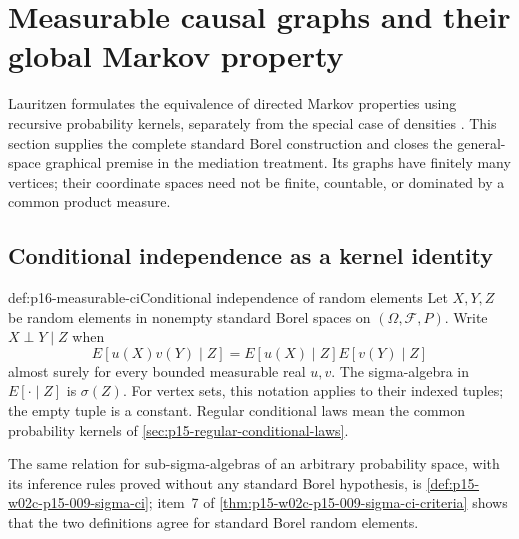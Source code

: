 \section{Measurable causal graphs and their global Markov property}
\label{sec:p16-measurable-causal-graphs}

Lauritzen formulates the equivalence of directed Markov properties using
recursive probability kernels, separately from the special case of
densities \cite[Theorems~1.28, 2.44 and 2.49; Propositions~2.46--2.48,
pp.~19--20, 65--68]{Lauritzen2019GraphicalLectures2020}.
This section supplies the complete standard Borel construction and closes
the general-space graphical premise in the mediation treatment. Its graphs
have finitely many vertices; their coordinate spaces need not be finite,
countable, or dominated by a common product measure.

\subsection{Conditional independence as a kernel identity}

\begin{hbdefinition}{def:p16-measurable-ci}{Conditional independence of random elements}
Let \(X,Y,Z\) be random elements in nonempty standard Borel spaces on
\((\Omega,\mathcal F,P)\). Write \(X\perp Y\mid Z\) when
\[
 E[u(X)v(Y)\mid Z]=E[u(X)\mid Z]E[v(Y)\mid Z]
\]
almost surely for every bounded measurable real \(u,v\).
The sigma-algebra in \(E[\cdot\mid Z]\) is \(\sigma(Z)\).
For vertex sets, this notation applies to their indexed tuples; the empty
tuple is a constant. Regular conditional laws mean the common probability
kernels of \cref{sec:p15-regular-conditional-laws}.
\end{hbdefinition}

The same relation for sub-sigma-algebras of an arbitrary probability
space, with its inference rules proved without any standard Borel
hypothesis, is \cref{def:p15-w02c-p15-009-sigma-ci}; item~7 of
\cref{thm:p15-w02c-p15-009-sigma-ci-criteria} shows that the two
definitions agree for standard Borel random elements.

